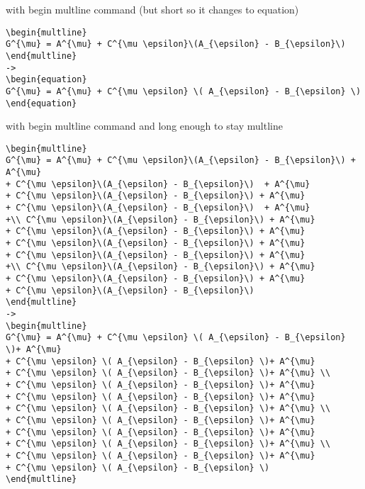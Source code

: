 \documentclass{article}
\def\){\Big)}
\def\({\Big(}
\begin{document}
with begin multline command (but short so it changes to equation)
\begin{verbatim}
\begin{multline}
G^{\mu} = A^{\mu} + C^{\mu \epsilon}\(A_{\epsilon} - B_{\epsilon}\) 
\end{multline}
->
\begin{equation}
G^{\mu} = A^{\mu} + C^{\mu \epsilon} \( A_{\epsilon} - B_{\epsilon} \)
\end{equation}
\end{verbatim}

with begin multline command and long enough to stay multline
\begin{verbatim}
\begin{multline}
G^{\mu} = A^{\mu} + C^{\mu \epsilon}\(A_{\epsilon} - B_{\epsilon}\) + A^{\mu} 
+ C^{\mu \epsilon}\(A_{\epsilon} - B_{\epsilon}\)  + A^{\mu} 
+ C^{\mu \epsilon}\(A_{\epsilon} - B_{\epsilon}\) + A^{\mu} 
+ C^{\mu \epsilon}\(A_{\epsilon} - B_{\epsilon}\)  + A^{\mu} 
+\\ C^{\mu \epsilon}\(A_{\epsilon} - B_{\epsilon}\) + A^{\mu} 
+ C^{\mu \epsilon}\(A_{\epsilon} - B_{\epsilon}\) + A^{\mu} 
+ C^{\mu \epsilon}\(A_{\epsilon} - B_{\epsilon}\) + A^{\mu} 
+ C^{\mu \epsilon}\(A_{\epsilon} - B_{\epsilon}\) + A^{\mu} 
+\\ C^{\mu \epsilon}\(A_{\epsilon} - B_{\epsilon}\) + A^{\mu} 
+ C^{\mu \epsilon}\(A_{\epsilon} - B_{\epsilon}\) + A^{\mu} 
+ C^{\mu \epsilon}\(A_{\epsilon} - B_{\epsilon}\) 
\end{multline}
->
\begin{multline}
G^{\mu} = A^{\mu} + C^{\mu \epsilon} \( A_{\epsilon} - B_{\epsilon} \)+ A^{\mu} 
+ C^{\mu \epsilon} \( A_{\epsilon} - B_{\epsilon} \)+ A^{\mu} 
+ C^{\mu \epsilon} \( A_{\epsilon} - B_{\epsilon} \)+ A^{\mu} \\
+ C^{\mu \epsilon} \( A_{\epsilon} - B_{\epsilon} \)+ A^{\mu} 
+ C^{\mu \epsilon} \( A_{\epsilon} - B_{\epsilon} \)+ A^{\mu} 
+ C^{\mu \epsilon} \( A_{\epsilon} - B_{\epsilon} \)+ A^{\mu} \\
+ C^{\mu \epsilon} \( A_{\epsilon} - B_{\epsilon} \)+ A^{\mu} 
+ C^{\mu \epsilon} \( A_{\epsilon} - B_{\epsilon} \)+ A^{\mu} 
+ C^{\mu \epsilon} \( A_{\epsilon} - B_{\epsilon} \)+ A^{\mu} \\
+ C^{\mu \epsilon} \( A_{\epsilon} - B_{\epsilon} \)+ A^{\mu} 
+ C^{\mu \epsilon} \( A_{\epsilon} - B_{\epsilon} \)
\end{multline}
\end{verbatim}
\end{document}
